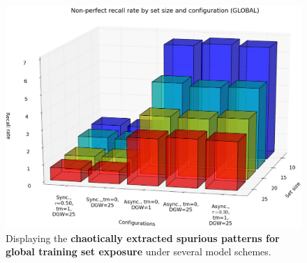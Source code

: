 \begin{figure}
    \centering
    \includegraphics[width=13cm]{fig/i-iters/global-spurious-recall}
    \caption{Displaying the \textbf{chaotically extracted spurious patterns for global training set exposure} under several model schemes.}
    \label{fig:global-recall-spurious}
\end{figure}

